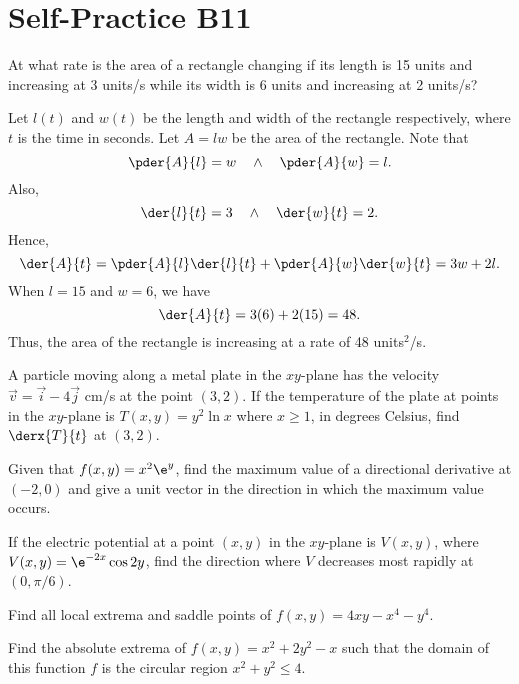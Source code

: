 \section{Self-Practice B11}

\begin{problem}
    At what rate is the area of a rectangle changing if its length is 15 units and increasing at 3 units/s while its width is 6 units and increasing at 2 units/s?
\end{problem}
\begin{solution}
    Let $l(t)$ and $w(t)$ be the length and width of the rectangle respectively, where $t$ is the time in seconds. Let $A = lw$ be the area of the rectangle. Note that \[\pder{A}{l} = w \quad \land \quad \pder{A}{w} = l.\] Also, \[\der{l}{t} = 3 \quad \land \quad \der{w}{t} = 2.\] Hence, \[\der{A}{t} = \pder{A}{l} \der{l}{t} + \pder{A}{w} \der{w}{t} = 3w + 2l.\] When $l = 15$ and $w = 6$, we have \[\der{A}{t} = 3(6) + 2(15) = 48.\] Thus, the area of the rectangle is increasing at a rate of 48 units$^2$/s.
\end{solution}

\begin{problem}
    A particle moving along a metal plate in the $xy$-plane has the velocity $\vec v = \vec i - 4 \vec j$ cm/s at the point $(3, 2)$. If the temperature of the plate at points in the $xy$-plane is $T(x, y) = y^2 \ln x$ where $x \geq 1$, in degrees Celsius, find $\derx{T}{t}$ at $(3, 2)$.
\end{problem}

\begin{problem}
    Given that $f(x, y) = x^2 \e^y$, find the maximum value of a directional derivative at $(-2, 0)$ and give a unit vector in the direction in which the maximum value occurs.
\end{problem}

\begin{problem}
    If the electric potential at a point $(x, y)$ in the $xy$-plane is $V(x, y)$, where $V(x, y) = \e^{-2x} \cos 2y$, find the direction where $V$ decreases most rapidly at $(0, \pi/6)$.
\end{problem}

\begin{problem}
    Find all local extrema and saddle points of $f(x, y) = 4xy - x^4 - y^4$.
\end{problem}

\begin{problem}
    Find the absolute extrema of $f(x, y) = x^2 + 2y^2 - x$ such that the domain of this function $f$ is the circular region $x^2 + y^2 \leq 4$.
\end{problem}


